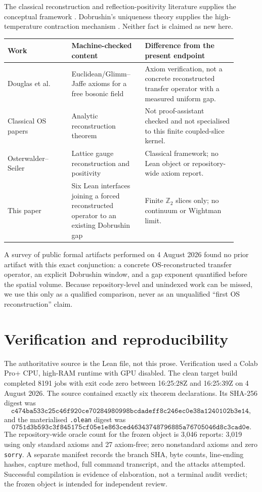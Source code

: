 \documentclass[11pt]{article}
\newcommand{\OracleReports}{3,046 reports: 3,019 using only standard axioms and 27 axiom-free; zero nonstandard axioms and zero \texttt{sorry}}
\newcommand{\ModuleHash}{\texttt{c474ba533c25c46f920ce70284980998bcdadeff8c246ec0e38a1240102b3e14}}
\newcommand{\OleanHash}{\texttt{0751d3b593c3f845175cf05e1e863ced46343748796885a76705046d8c3cad0e}}
\begin{document}
The classical reconstruction and reflection-positivity literature supplies
the conceptual framework \cite{OS1,OS2,OsterwalderSeiler,FILS}.  Dobrushin's
uniqueness theory supplies the high-temperature contraction mechanism
\cite{Dobrushin1968}.  Neither fact is claimed as new here.

\begin{center}
\small
\begin{tabular}{@{}P{0.25\linewidth}P{0.29\linewidth}P{0.36\linewidth}@{}}
\toprule
Work & Machine-checked content & Difference from the present endpoint \\
\midrule
Douglas et al.~\cite{DouglasFormalQFT} & Euclidean/Glimm--Jaffe axioms for a free bosonic field & Axiom verification, not a concrete reconstructed transfer operator with a measured uniform gap. \\
Classical OS papers \cite{OS1,OS2} & Analytic reconstruction theorem & Not proof-assistant checked and not specialised to this finite coupled-slice kernel. \\
Osterwalder--Seiler \cite{OsterwalderSeiler} & Lattice gauge reconstruction and positivity & Classical framework; no Lean object or repository-wide axiom report. \\
This paper & Six Lean interfaces joining a forced reconstructed operator to an existing Dobrushin gap & Finite $\mathbb Z_2$ slices only; no continuum or Wightman limit. \\
\bottomrule
\end{tabular}
\end{center}

A survey of public formal artifacts performed on 4 August 2026 found no prior
artifact with this exact conjunction: a concrete OS-reconstructed transfer
operator, an explicit Dobrushin window, and a gap exponent quantified before
the spatial volume.  Because repository-level and unindexed work can be missed,
we use this only as a qualified comparison, never as an unqualified ``first OS
reconstruction'' claim.

\section{Verification and reproducibility}

The authoritative source is the Lean file, not this prose.  Verification used
a Colab Pro+ CPU, high-RAM runtime with GPU disabled.  The clean target build
completed 8191 jobs with exit code zero between 16:25:28Z and 16:25:39Z on
4 August 2026.  The source contained exactly six theorem declarations.  Its
SHA-256 digest was
\[
  \ModuleHash,
\]
and the materialised \texttt{.olean} digest was
\[
  \OleanHash.
\]
The repository-wide oracle count for the frozen object is
\OracleReports.  A separate manifest records the branch SHA, byte counts,
line-ending hashes, capture method, full command transcript, and the attacks
attempted.  Successful compilation is evidence of elaboration, not a terminal
audit verdict; the frozen object is intended for independent review.
\end{document}
